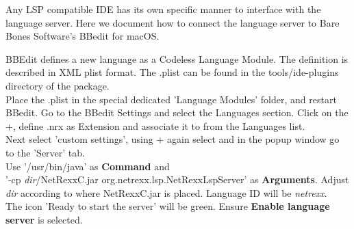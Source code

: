 Any LSP compatible IDE has its own specific manner to interface with the language server.
Here we document how to connect the \nr{} language server to Bare Bones Software's BBedit for macOS.

BBEdit defines a new language as a Codeless Language Module. The definition is described in XML plist format.
The \nr{}.plist can be found in the tools/ide-plugins directory of the package.\\
Place the \nr{}.plist in the special dedicated 'Language Modules' folder, and restart BBedit. Go to the 
BBedit Settings and select the Languages section. Click on the +, define .nrx as Extension and 
associate it to \nr{} from the Languages list.\\
Next select 'custom settings', using + again select \nr{} and in the popup window go to the 'Server' tab.\\
Use '/usr/bin/java' as \textbf{Command} and \\
'-cp \emph{dir}/NetRexxC.jar org.netrexx.lsp.NetRexxLspServer' as \textbf{Arguments}.
Adjust \emph{dir} according to where NetRexxC.jar is placed. 
Language ID will be \emph{netrexx}.\\
The icon 'Ready to start the server' will be green. Ensure \textbf{Enable language server} is selected.


